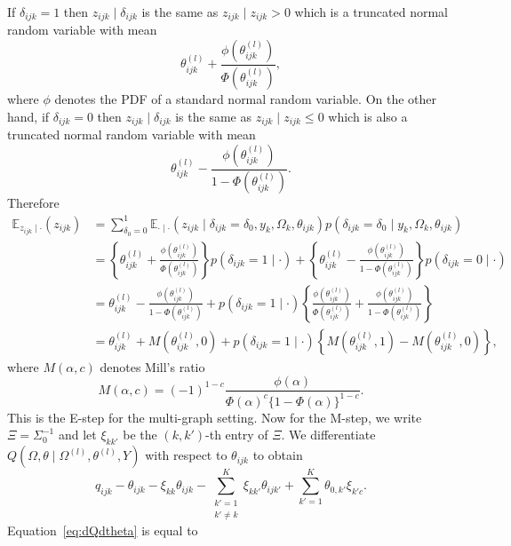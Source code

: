 \documentclass[a4paper, 11pt, oneside]{report}
\newcommand{\E}{\mathbb{E}}
\newcommand{\1}{\mathds{1}}
\newcommand{\powl}{^{(l)}}
\newcommand{\inv}{^{-1}}
\newcommand{\tijkl}{\theta_{ijk}\powl}
\begin{document}
If $\delta_{ijk} = 1$ then $z_{ijk} \mid \delta_{ijk}$ is the same as $z_{ijk}
	\mid z_{ijk} > 0$ which is a truncated normal random variable with mean
\[\theta_{ijk}\powl + \frac{\phi(\theta_{ijk}\powl)}{\Phi(\theta_{ijk}\powl)},\]
where $\phi$ denotes the PDF of a standard normal random variable.
On the other hand, if $\delta_{ijk} = 0$ then $z_{ijk} \mid \delta_{ijk}$ is the
same as $z_{ijk} \mid z_{ijk} \leq 0$ which is also a truncated normal random
variable with mean
\[
	\theta_{ijk}\powl - \frac{\phi(\theta_{ijk}\powl)}{1 - \Phi(\theta_{ijk}\powl)}.
\]
Therefore
\begin{align*}
	\E_{z_{ijk} \mid \cdot}(z_{ijk}) & = \sum_{\delta_0 = 0}^1 \E_{\cdot \mid
		\cdot}\left(z_{ijk} \mid \delta_{ijk} = \delta_0, y_k, \Omega_k, \theta_{ijk}\right)
	p(\delta_{ijk} = \delta_0 \mid y_k, \Omega_k, \theta_{ijk})                                              \\
	                                 & = \left\{\tijkl +
	\frac{\phi(\tijkl)}{\Phi(\tijkl)}\right\}
	p(\delta_{ijk} = 1 \mid \cdot) + \left\{\theta_{ijk}\powl -
	\frac{\phi(\theta_{ijk}\powl)}{1 -
	\Phi(\theta_{ijk}\powl)}\right\}p(\delta_{ijk} = 0 \mid \cdot) \label{eq:expect-z}                       \\
	                                 & = \tijkl - \frac{\phi(\tijkl)}{1 - \Phi(\tijkl)} + p(\delta_{ijk} = 1
	\mid \cdot) \left\{\frac{\phi(\tijkl)}{\Phi(\tijkl)} + \frac{\phi(\tijkl)}{1
	- \Phi(\tijkl)}\right\}                                                                                  \\
	                                 & = \tijkl + M\left(\tijkl, 0\right) + p(\delta_{ijk} = 1 \mid
	\cdot)\left\{M\left(\tijkl, 1\right) -
	M\left(\tijkl, 0\right)\right\},
\end{align*}
where $M(\alpha, c)$ denotes Mill's ratio
\[
	M(\alpha, c) = (-1)^{1-c}\frac{\phi(\alpha)}{\Phi(\alpha)^c \{1 - \Phi(\alpha)\}^{1-c}}.
\]
This is the E-step for the multi-graph setting.
Now for the M-step, we write $\Xi = \Sigma_0\inv$ and let $\xi_{kk'}$ be the $(k, k')$-th entry of $\Xi$.
We differentiate $Q(\Omega, \theta \mid \Omega\powl, \theta\powl, Y)$ with respect to
$\theta_{ijk}$ to obtain
\begin{equation}\label{eq:dQdtheta}
	q_{ijk} - \theta_{ijk}  - \xi_{kk} \theta_{ijk} - \sum_{\substack
		{k' = 1 \\ k' \neq k}}^K \xi_{k k'} \theta_{ijk'} + \sum_{k'=1}^K \theta_{0,k'} \xi_{k'c}.
\end{equation}
Equation~\eqref{eq:dQdtheta} is equal to
\end{document}
